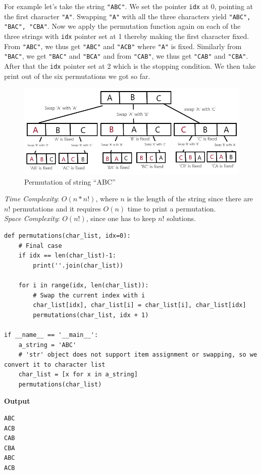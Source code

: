 \documentclass[a4paper,11pt]{book}
\begin{document}
\noindent For example let's take the string \lstinline{"ABC"}. We set the pointer \lstinline{idx} at 0, pointing at the first character \lstinline{"A"}. Swapping \lstinline{"A"} with all the three characters yield \lstinline{"ABC", "BAC", "CBA"}. Now we apply the permutation function again on each of the three strings with \lstinline{idx} pointer set at 1 thereby making the first character fixed. From \lstinline{"ABC"}, we thus get \lstinline{"ABC"} and \lstinline{"ACB"} where \lstinline{"A"} is fixed. Similarly from \lstinline{"BAC"}, we get \lstinline{"BAC"} and \lstinline{"BCA"} and from \lstinline{"CAB"}, we thus get \lstinline{"CAB"} and \lstinline{"CBA"}. After that the \lstinline{idx} pointer set at 2 which is the stopping condition. We then take print out of the six permutations we got so far.
\begin{figure}[ht]
	\centering
	\includegraphics[scale=0.45]{code/sort/pic/recursiontreeabc.png}
	\caption{Permutation of string ``ABC''}
\end{figure}
\vspace{5mm}

\noindent \textit{Time Complexity}: $O(n * n!)$, where $n$ is the length of the string since there are $n!$ permutations and it requires $O(n)$ time to print a permutation.\\
\textit{Space Complexity}: $O(n!)$, since one has to keep $n!$ solutions.

\begin{lstlisting}
def permutations(char_list, idx=0):
    # Final case
    if idx == len(char_list)-1:
        print(''.join(char_list))
 
    for i in range(idx, len(char_list)):
        # Swap the current index with i
        char_list[idx], char_list[i] = char_list[i], char_list[idx]
        permutations(char_list, idx + 1)
 
if __name__ == '__main__':
    a_string = 'ABC'
    # 'str' object does not support item assignment or swapping, so we convert it to character list
    char_list = [x for x in a_string]
    permutations(char_list)
\end{lstlisting}
\textbf{Output}
\begin{lstlisting}
ABC
ACB
CAB
CBA
ABC
ACB
\end{lstlisting}
\end{document}
